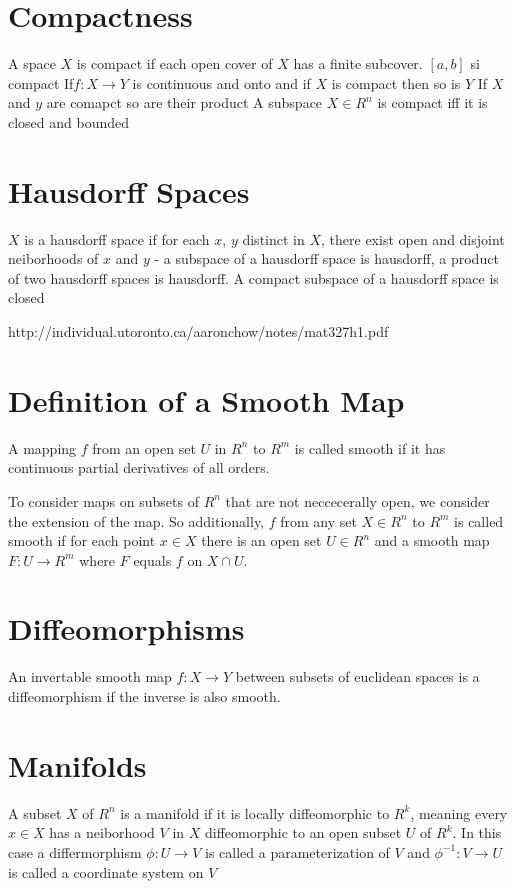 \documentclass{homework}
\begin{document}
\section{Compactness}
 A space $X$ is compact if each open cover of $X$ has a finite subcover. $[a,b]$ si compact
 If$f:X \rightarrow Y$ is continuous and onto and if $X$ is compact then so is $Y$
 If $X$ and $y$ are comapct so are their product
 A subspace $X \in R^n$ is compact iff it is closed and bounded


\section{Hausdorff Spaces}

$X$ is a hausdorff space if for each $x$, $y$ distinct in $X$, there exist open and disjoint neiborhoods of $x$ and $y$ - a subspace of a hausdorff space is hausdorff, a product of two hausdorff spaces is hausdorff. A compact subspace of a hausdorff space is closed

http://individual.utoronto.ca/aaronchow/notes/mat327h1.pdf  

\section{Definition of a Smooth Map}

A mapping $f$ from an open set $U$ in $R^n$ to $R^m$ is called smooth if it has continuous partial derivatives of all orders. 

To consider maps on subsets of $R^n$ that are not neccecerally open, we consider the extension of the map. So additionally, $f$ from any set $X \in R^n$ to $R^m$ is called smooth if for each point $x \in X$ there is an open set $U \in R^n$ and a smooth map $F: U \rightarrow R^m$ where $F$ equals $f$ on $X \cap U$. 


\section{Diffeomorphisms}

An invertable smooth map $f:X \rightarrow Y$ between subsets of euclidean spaces is a diffeomorphism if the inverse is also smooth.

\section{Manifolds}

A subset $X$ of $R^n$ is a manifold if it is locally diffeomorphic to $R^k$, meaning every $x \in X$ has a neiborhood $V$ in $X$ diffeomorphic to an open subset $U$ of $R^k$. In this case a differmorphism $\phi: U \rightarrow V$ is called a parameterization of $V$ and $\phi^{-1}: V \rightarrow U$ is called a coordinate system on $V$
\end{document}
